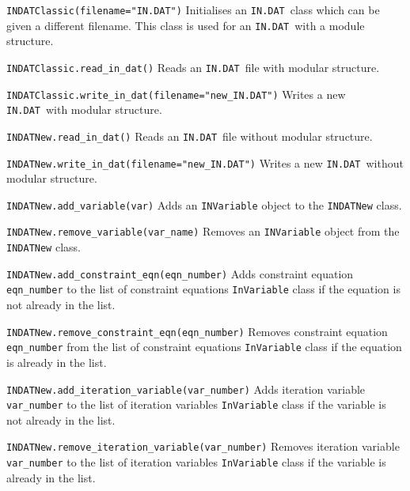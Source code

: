 \documentclass[11pt,a4paper]{report}
\newcommand{\indat}{\mbox{\texttt{IN.DAT}}}
\begin{document}
\begin{description}

\item{\verb|INDATClassic(filename="IN.DAT")| } Initialises an \indat\ class
  which can be given a different filename. This class is used for an \indat\
  with a module structure.

\item{\verb|INDATClassic.read_in_dat()| } Reads an \indat\ file with modular
  structure.

\item{\verb|INDATClassic.write_in_dat(filename="new_IN.DAT")| } Writes a new
  \indat\ with modular structure.

\item{\verb|INDATNew.read_in_dat()| } Reads an \indat\ file without modular
  structure.

\item{\verb|INDATNew.write_in_dat(filename="new_IN.DAT")| } Writes a new
  \indat\ without modular structure.

\item{\verb|INDATNew.add_variable(var)| } Adds an \verb|INVariable| object to
  the \verb|INDATNew| class.

\item{\verb|INDATNew.remove_variable(var_name)| } Removes an
  \verb|INVariable| object from the \verb|INDATNew| class.

\item{\verb|INDATNew.add_constraint_eqn(eqn_number)|} Adds constraint
  equation \verb|eqn_number| to the list of constraint equations
  \verb|InVariable| class if the equation is not already in the list.

\item{\verb|INDATNew.remove_constraint_eqn(eqn_number)|} Removes
  constraint equation \verb|eqn_number| from the list of constraint
  equations \verb|InVariable| class if the equation is already in the list.

\item{\verb|INDATNew.add_iteration_variable(var_number)| } Adds iteration
  variable \verb|var_number| to the list of iteration variables
  \verb|InVariable| class if the variable is not already in the list.

\item{\verb|INDATNew.remove_iteration_variable(var_number)| } Removes
  iteration variable \verb|var_number| to the list of iteration variables
  \verb|InVariable| class if the variable is already in the list.

\end{description}
\end{document}
